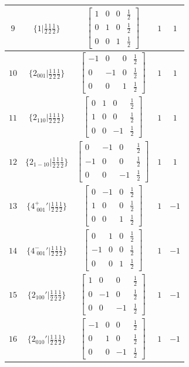\documentclass[fleqn,8pt]{jsarticle}
\begin{document}
\begin{longtable}{ccccc}
$ 9 $ & $ \{1|\frac{1}{2} \frac{1}{2} \frac{1}{2}\} $ & $ \begin{bmatrix} 1 & 0 & 0 & \frac{1}{2} \\ 0 & 1 & 0 & \frac{1}{2} \\ 0 & 0 & 1 & \frac{1}{2} \end{bmatrix} $ & $ 1 $ & $ 1 $ \\ \hline
$ 10 $ & $ \{2{}_{001}|\frac{1}{2} \frac{1}{2} \frac{1}{2}\} $ & $ \begin{bmatrix} -1 & 0 & 0 & \frac{1}{2} \\ 0 & -1 & 0 & \frac{1}{2} \\ 0 & 0 & 1 & \frac{1}{2} \end{bmatrix} $ & $ 1 $ & $ 1 $ \\ \hline
$ 11 $ & $ \{2{}_{110}|\frac{1}{2} \frac{1}{2} \frac{1}{2}\} $ & $ \begin{bmatrix} 0 & 1 & 0 & \frac{1}{2} \\ 1 & 0 & 0 & \frac{1}{2} \\ 0 & 0 & -1 & \frac{1}{2} \end{bmatrix} $ & $ 1 $ & $ 1 $ \\ \hline
$ 12 $ & $ \{2{}_{1-10}|\frac{1}{2} \frac{1}{2} \frac{1}{2}\} $ & $ \begin{bmatrix} 0 & -1 & 0 & \frac{1}{2} \\ -1 & 0 & 0 & \frac{1}{2} \\ 0 & 0 & -1 & \frac{1}{2} \end{bmatrix} $ & $ 1 $ & $ 1 $ \\ \hline
$ 13 $ & $ \{4^{+}_{\,\,001}{}'|\frac{1}{2} \frac{1}{2} \frac{1}{2}\} $ & $ \begin{bmatrix} 0 & -1 & 0 & \frac{1}{2} \\ 1 & 0 & 0 & \frac{1}{2} \\ 0 & 0 & 1 & \frac{1}{2} \end{bmatrix} $ & $ 1 $ & $ -1 $ \\ \hline
$ 14 $ & $ \{4^{-}_{\,\,001}{}'|\frac{1}{2} \frac{1}{2} \frac{1}{2}\} $ & $ \begin{bmatrix} 0 & 1 & 0 & \frac{1}{2} \\ -1 & 0 & 0 & \frac{1}{2} \\ 0 & 0 & 1 & \frac{1}{2} \end{bmatrix} $ & $ 1 $ & $ -1 $ \\ \hline
$ 15 $ & $ \{2{}_{100}{}'|\frac{1}{2} \frac{1}{2} \frac{1}{2}\} $ & $ \begin{bmatrix} 1 & 0 & 0 & \frac{1}{2} \\ 0 & -1 & 0 & \frac{1}{2} \\ 0 & 0 & -1 & \frac{1}{2} \end{bmatrix} $ & $ 1 $ & $ -1 $ \\ \hline
$ 16 $ & $ \{2{}_{010}{}'|\frac{1}{2} \frac{1}{2} \frac{1}{2}\} $ & $ \begin{bmatrix} -1 & 0 & 0 & \frac{1}{2} \\ 0 & 1 & 0 & \frac{1}{2} \\ 0 & 0 & -1 & \frac{1}{2} \end{bmatrix} $ & $ 1 $ & $ -1 $ \\
\end{longtable}
\end{document}
